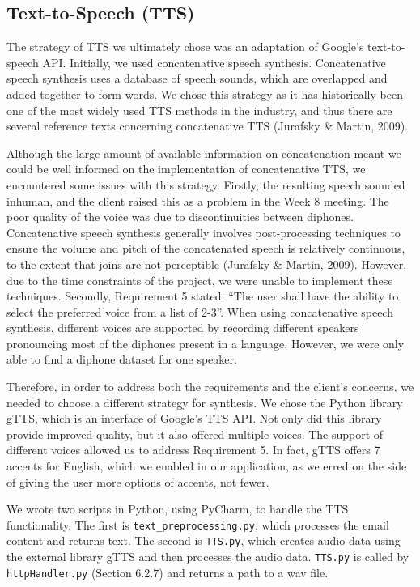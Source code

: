 \documentclass{article}
\begin{document}
\subsection{Text-to-Speech (TTS)}
The strategy of TTS we ultimately chose was an adaptation of Google’s text-to-speech API. Initially, we used concatenative speech synthesis. Concatenative speech synthesis uses a database of speech sounds, which are overlapped and added together to form words. We chose this strategy as it has historically been one of the most widely used TTS methods in the industry, and thus there are several reference texts concerning concatenative TTS (Jurafsky \& Martin, 2009). 

Although the large amount of available information on concatenation meant we could be well informed on the implementation of concatenative TTS, we encountered some issues with this strategy. Firstly, the resulting speech sounded inhuman, and the client raised this as a problem in the Week 8 meeting. The poor quality of the voice was due to discontinuities between diphones. Concatenative speech synthesis generally involves post-processing techniques to ensure the volume and pitch of the concatenated speech is relatively continuous, to the extent that joins are not perceptible (Jurafsky \& Martin, 2009). However, due to the time constraints of the project, we were unable to implement these techniques. Secondly, Requirement 5 stated: “The user shall have the ability to select the preferred voice from a list of 2-3”. When using concatenative speech synthesis, different voices are supported by recording different speakers pronouncing most of the diphones present in a language. However, we were only able to find a diphone dataset for one speaker.

Therefore, in order to address both the requirements and the client’s concerns, we needed to choose a different strategy for synthesis. We chose the Python library gTTS, which is an interface of Google's TTS API. Not only did this library provide improved quality, but it also offered multiple voices. The support of different voices allowed us to address Requirement 5. In fact, gTTS offers 7 accents for English, which we enabled in our application, as we erred on the side of giving the user more options of accents, not fewer.

We wrote two scripts in Python, using PyCharm, to handle the TTS functionality. The first is \texttt{text\_preprocessing.py}, which processes the email content and returns text. The second is \texttt{TTS.py}, which creates audio data using the external library gTTS and then processes the audio data. \texttt{TTS.py} is called by \texttt{httpHandler.py} (Section 6.2.7) and returns a path to a wav file.
\end{document}
